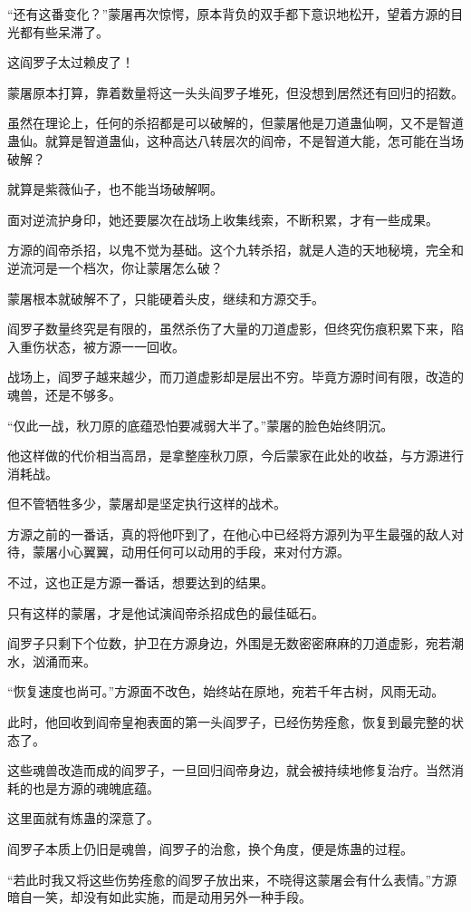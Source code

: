 \begin{this_body}
“还有这番变化？”蒙屠再次惊愕，原本背负的双手都下意识地松开，望着方源的目光都有些呆滞了。

这阎罗子太过赖皮了！

蒙屠原本打算，靠着数量将这一头头阎罗子堆死，但没想到居然还有回归的招数。

虽然在理论上，任何的杀招都是可以破解的，但蒙屠他是刀道蛊仙啊，又不是智道蛊仙。就算是智道蛊仙，这种高达八转层次的阎帝，不是智道大能，怎可能在当场破解？

就算是紫薇仙子，也不能当场破解啊。

面对逆流护身印，她还要屡次在战场上收集线索，不断积累，才有一些成果。

方源的阎帝杀招，以鬼不觉为基础。这个九转杀招，就是人造的天地秘境，完全和逆流河是一个档次，你让蒙屠怎么破？

蒙屠根本就破解不了，只能硬着头皮，继续和方源交手。

阎罗子数量终究是有限的，虽然杀伤了大量的刀道虚影，但终究伤痕积累下来，陷入重伤状态，被方源一一回收。

战场上，阎罗子越来越少，而刀道虚影却是层出不穷。毕竟方源时间有限，改造的魂兽，还是不够多。

“仅此一战，秋刀原的底蕴恐怕要减弱大半了。”蒙屠的脸色始终阴沉。

他这样做的代价相当高昂，是拿整座秋刀原，今后蒙家在此处的收益，与方源进行消耗战。

但不管牺牲多少，蒙屠却是坚定执行这样的战术。

方源之前的一番话，真的将他吓到了，在他心中已经将方源列为平生最强的敌人对待，蒙屠小心翼翼，动用任何可以动用的手段，来对付方源。

不过，这也正是方源一番话，想要达到的结果。

只有这样的蒙屠，才是他试演阎帝杀招成色的最佳砥石。

阎罗子只剩下个位数，护卫在方源身边，外围是无数密密麻麻的刀道虚影，宛若潮水，汹涌而来。

“恢复速度也尚可。”方源面不改色，始终站在原地，宛若千年古树，风雨无动。

此时，他回收到阎帝皇袍表面的第一头阎罗子，已经伤势痊愈，恢复到最完整的状态了。

这些魂兽改造而成的阎罗子，一旦回归阎帝身边，就会被持续地修复治疗。当然消耗的也是方源的魂魄底蕴。

这里面就有炼蛊的深意了。

阎罗子本质上仍旧是魂兽，阎罗子的治愈，换个角度，便是炼蛊的过程。

“若此时我又将这些伤势痊愈的阎罗子放出来，不晓得这蒙屠会有什么表情。”方源暗自一笑，却没有如此实施，而是动用另外一种手段。


\end{this_body}
